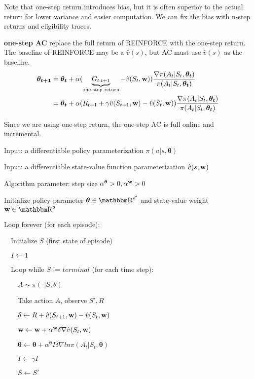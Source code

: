 \documentclass[sutton_barto_notes.tex]{subfiles}
\begin{document}
Note that one-step return introduces bias, but it is often superior to the actual return for lower variance and easier computation. We can fix the bias with n-step returns and eligibility traces.

\begin{definition}
\textbf{one-step AC} replace the full return of REINFORCE with the one-step return. The baseline of REINFORCE may be a $\hat{v}(s)$, but AC must use $\hat{v}(s)$ as the baseline.
\begin{align*}
\bm{\theta_{t+1}} &\doteq \bm{\theta_t} + \alpha (\underbrace{G_{t:t+1}}_{\text{one-step return}} - \hat{v}(S_t, {\operatorname*{\mathbf{w}}})) \frac{\nabla\pi(A_t|S_t,\bm{\theta_t})}{\pi(A_t|S_t,\bm{\theta_t})} \\
&= \bm{\theta_t} + \alpha (R_{t+1} + \gamma\hat{v}(S_{t+1},{\operatorname*{\mathbf{w}}}) - \hat{v}(S_t, {\operatorname*{\mathbf{w}}})) \frac{\nabla\pi(A_t|S_t,\bm{\theta_t})}{\pi(A_t|S_t,\bm{\theta_t})} \\
\end{align*}
\end{definition}

Since we are using one-step return, the one-step AC is full online and incremental.

\begin{tcolorbox}[width=1.1\textwidth,title={One-step Actor-Critic (episodic), for estimating $\pi_\theta\approx\pi_*$}]
Input: a differentiable policy parameterization $\pi(a|s,\bm{\theta})$

Input: a differentiable state-value function parameterization $\hat{v}(s,{\operatorname*{\mathbf{w}}})$

Algorithm parameter: step size $\alpha^{\bm{\theta}} > 0, \alpha^{{\operatorname*{\mathbf{w}}}} > 0$

Initialize policy parameter $\bm{\theta} \in \R^{d'}$ and state-value weight ${\bw} \in \R^d$

Loop forever (for each episode):

$\quad$Initialize $S$ (first state of episode)

$\quad I \leftarrow 1$

$\quad$Loop while $S$ != $terminal$ (for each time step):

$\quad\quad A \sim \pi(\cdot | S, \theta)$

$\quad\quad$Take action $A$, observe $S', R$

$\quad\quad \delta\leftarrow R + \hat{v}(S_{t+1},{\operatorname*{\mathbf{w}}}) - \hat{v}(S_t, {\operatorname*{\mathbf{w}}})$

$\quad\quad {\operatorname*{\mathbf{w}}} \leftarrow {\operatorname*{\mathbf{w}}} + \alpha^{{\operatorname*{\mathbf{w}}}}\delta\nabla\hat{v}(S_t,{\operatorname*{\mathbf{w}}})$

$\quad\quad\bm{\theta}\leftarrow\bm{\theta}+\alpha^{\bm{\theta}} I \delta \nabla ln\pi(A_t | S_t, \bm{\theta})$

$\quad\quad I \leftarrow \gamma I$

$\quad\quad S \leftarrow S'$
\end{tcolorbox}
\end{document}
